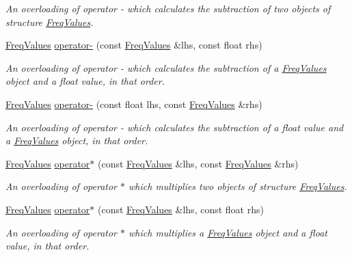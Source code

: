 \begin{DoxyCompactItemize}
\begin{DoxyCompactList}\small\item\em An overloading of operator -\/ which calculates the subtraction of two objects of structure {\itshape \hyperlink{structFreqValues}{Freq\+Values}}. \end{DoxyCompactList}\item 
\hyperlink{structFreqValues}{Freq\+Values} \hyperlink{structFreqValues_ade558a5146a3dbea46f85e64d959ff3d}{operator-\/} (const \hyperlink{structFreqValues}{Freq\+Values} \&lhs, const float rhs)
\begin{DoxyCompactList}\small\item\em An overloading of operator -\/ which calculates the subtraction of a {\itshape \hyperlink{structFreqValues}{Freq\+Values}} object and a {\itshape float} value, in that order. \end{DoxyCompactList}\item 
\hyperlink{structFreqValues}{Freq\+Values} \hyperlink{structFreqValues_aa248d5bc83ba0c614137b042947064a8}{operator-\/} (const float lhs, const \hyperlink{structFreqValues}{Freq\+Values} \&rhs)
\begin{DoxyCompactList}\small\item\em An overloading of operator -\/ which calculates the subtraction of a {\itshape float} value and a {\itshape \hyperlink{structFreqValues}{Freq\+Values}} object, in that order. \end{DoxyCompactList}\item 
\hyperlink{structFreqValues}{Freq\+Values} \hyperlink{structFreqValues_a3e567844a5d4347e3b30e696132bfb7c}{operator$\ast$} (const \hyperlink{structFreqValues}{Freq\+Values} \&lhs, const \hyperlink{structFreqValues}{Freq\+Values} \&rhs)
\begin{DoxyCompactList}\small\item\em An overloading of operator $\ast$ which multiplies two objects of structure {\itshape \hyperlink{structFreqValues}{Freq\+Values}}. \end{DoxyCompactList}\item 
\hyperlink{structFreqValues}{Freq\+Values} \hyperlink{structFreqValues_aea565aadf51307e09845c72179e5082d}{operator$\ast$} (const \hyperlink{structFreqValues}{Freq\+Values} \&lhs, const float rhs)
\begin{DoxyCompactList}\small\item\em An overloading of operator $\ast$ which multiplies a {\itshape \hyperlink{structFreqValues}{Freq\+Values}} object and a {\itshape float} value, in that order. \end{DoxyCompactList}\item 

\end{DoxyCompactItemize}
